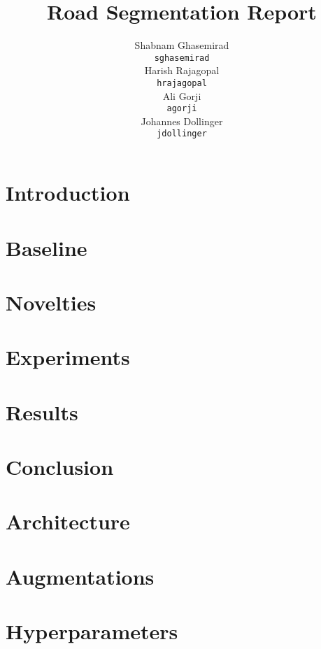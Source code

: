 \documentclass[twocolumn]{article}
\title{Road Segmentation Report}
\author{
  Shabnam Ghasemirad\\
  \texttt{sghasemirad} \\
   \And
  Harish Rajagopal \\
  \texttt{hrajagopal} \\
   \And
  Ali Gorji \\
  \texttt{agorji} \\
   \And
  Johannes Dollinger \\
  \texttt{jdollinger} \\
}
\begin{document}
\twocolumn[\maketitle]

\section{Introduction} \label{intro}


\section{Baseline}\label{section:baselines}


\section{Novelties}\label{section:novelties}


\section{Experiments}\label{section:experiments}


\section{Results}\label{section:results}


\section{Conclusion}\label{section:conclusion}


\newpage

\small
\printbibliography{}

\appendix

\section{Architecture}\label{appendix:architecture}


\section{Augmentations}\label{appendix:augmentations}


\section{Hyperparameters}\label{appendix:hyper-params}

\end{document}
